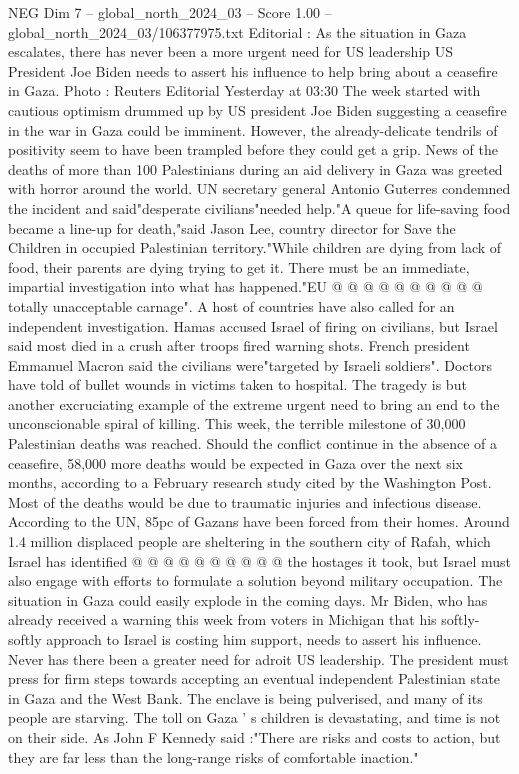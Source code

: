 \begin{textsample}{NEG Dim 7 – global\_north\_2024\_03 – Score 1.00 – global\_north\_2024\_03/106377975.txt}  \label{ex:f7_neg_421}
Editorial : As the situation in Gaza escalates, there has never been a more urgent need for US leadership US President Joe Biden needs to assert his influence to help bring about a ceasefire in Gaza.
Photo : Reuters Editorial Yesterday at 03:30 The week started with cautious optimism drummed up by US president Joe Biden suggesting a ceasefire in the war in Gaza could be imminent.
However, the already-delicate tendrils of positivity seem to have been trampled before they could get a grip.
News of the deaths of more than 100 Palestinians during an aid delivery in Gaza was greeted with horror around the world.
UN secretary general Antonio Guterres condemned the incident and said"desperate civilians"needed help."A queue for life-saving food became a line-up for death,"said Jason Lee, country director for Save the Children in occupied Palestinian territory."While children are dying from lack of food, their parents are dying trying to get it.
There must be an immediate, impartial investigation into what has happened."EU @ @ @ @ @ @ @ @ @ @ totally unacceptable carnage".
A host of countries have also called for an independent investigation.
Hamas accused Israel of firing on civilians, but Israel said most died in a crush after troops fired warning shots.
French president Emmanuel Macron said the civilians were"targeted by Israeli soldiers".
Doctors have told of bullet wounds in victims taken to hospital.
The tragedy is but another excruciating example of the extreme urgent need to bring an end to the unconscionable spiral of killing.
This week, the terrible milestone of 30,000 Palestinian deaths was reached.
Should the conflict continue in the absence of a ceasefire, 58,000 more deaths would be expected in Gaza over the next six months, according to a February research study cited by the Washington Post.
Most of the deaths would be due to traumatic injuries and infectious disease.
According to the UN, 85pc of Gazans have been forced from their homes.
Around 1.4 million displaced people are sheltering in the southern city of Rafah, which Israel has identified @ @ @ @ @ @ @ @ @ @ the hostages it took, but Israel must also engage with efforts to formulate a solution beyond military occupation.
The situation in Gaza could easily explode in the coming days.
Mr Biden, who has already received a warning this week from voters in Michigan that his softly-softly approach to Israel is costing him support, needs to assert his influence.
Never has there been a greater need for adroit US leadership.
The president must press for firm steps towards accepting an eventual independent Palestinian state in Gaza and the West Bank.
The enclave is being pulverised, and many of its people are starving.
The toll on Gaza ' s children is devastating, and time is not on their side.
As John F Kennedy said :"There are risks and costs to action, but they are far less than the long-range risks of comfortable inaction."

\end{textsample}

